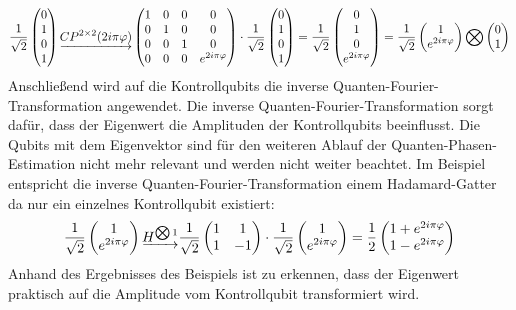 \[
  \frac{1}{\sqrt{2}}
  \begin{pmatrix}
   0 \\
   1 \\
   0 \\
   1
  \end{pmatrix}
  \underrightarrow{CP^{2\times 2}(2 i \pi \varphi)}
  \begin{pmatrix}
    1 & 0 & 0 & 0\\
    0 & 1 & 0 & 0\\
    0 & 0 & 1 & 0\\
    0 & 0 & 0 & e^{2 i \pi \varphi}
  \end{pmatrix}
  \cdot
  \frac{1}{\sqrt{2}}
  \begin{pmatrix}
   0 \\
   1 \\
   0 \\
   1
  \end{pmatrix}
  =
  \frac{1}{\sqrt{2}}
  \begin{pmatrix}
    0 \\
    1 \\
    0 \\
    e^{2 i \pi \varphi}
  \end{pmatrix}
  =
  \frac{1}{\sqrt{2}}
  \begin{pmatrix}
    1 \\
    e^{2 i \pi \varphi}
   \end{pmatrix}
   \operatorname{\bigotimes}
   \begin{pmatrix}
    0 \\
    1 
   \end{pmatrix}
  \]
Anschließend wird auf die Kontrollqubits die inverse Quanten-Fourier-Transformation angewendet.
Die inverse Quanten-Fourier-Transformation sorgt dafür, 
dass der Eigenwert die Amplituden der Kontrollqubits beeinflusst.
Die Qubits mit dem Eigenvektor sind für den weiteren Ablauf der Quanten-Phasen-Estimation nicht mehr relevant 
und werden nicht weiter beachtet.
Im Beispiel entspricht die inverse Quanten-Fourier-Transformation einem Hadamard-Gatter da nur ein einzelnes Kontrollqubit existiert:
\[
\frac{1}{\sqrt{2}}
\begin{pmatrix}
  1 \\
  e^{2 i \pi \varphi}
 \end{pmatrix}
 \underrightarrow{H^{\operatorname{\bigotimes}1}}
 \frac{1}{\sqrt{2}}
 \begin{pmatrix}
  1 & 1\\
  1 & -1
 \end{pmatrix}
 \cdot
 \frac{1}{\sqrt{2}}
\begin{pmatrix}
  1 \\
  e^{2 i \pi \varphi}
 \end{pmatrix}
 =
 \frac{1}{2}
 \begin{pmatrix}
  1 + e^{2 i \pi \varphi}\\
  1 - e^{2 i \pi \varphi}
 \end{pmatrix}
\]
Anhand des Ergebnisses des Beispiels ist zu erkennen, dass der Eigenwert praktisch auf die Amplitude vom Kontrollqubit transformiert wird.

